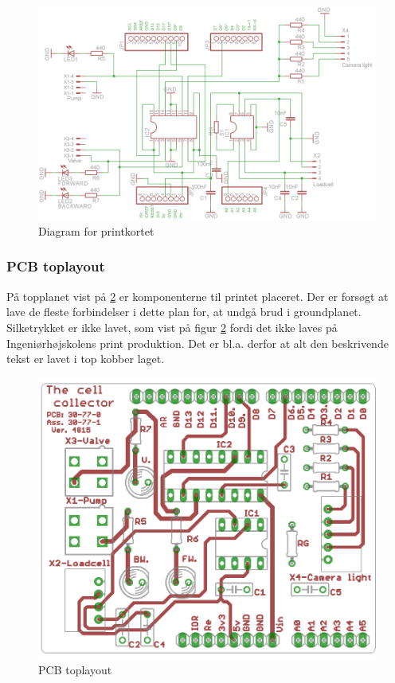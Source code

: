 \begin{figure}[H]

	\centering
	\includegraphics[width=1\textwidth]{billeder/hardware/Diagram.png}
	\caption{Diagram for printkortet}
	\label{fig:PCBdiagram}
\end{figure}

\newpage
\subsubsection{PCB toplayout}
På topplanet vist på \ref{fig:PCBtoplayout} er komponenterne til printet placeret. Der er forsøgt at lave de fleste forbindelser i dette plan for, at undgå brud i groundplanet. Silketrykket er ikke lavet, som vist på figur \ref{fig:PCBtoplayout} fordi det ikke laves på Ingeniørhøjskolens print produktion. Det er bl.a. derfor at alt den beskrivende tekst er lavet i top kobber laget. 

\begin{figure}[H]
	\centering
	\includegraphics[width=1\textwidth]{billeder/hardware/Toplayout.png}
	\caption{PCB toplayout}
	\label{fig:PCBtoplayout}
\end{figure}

